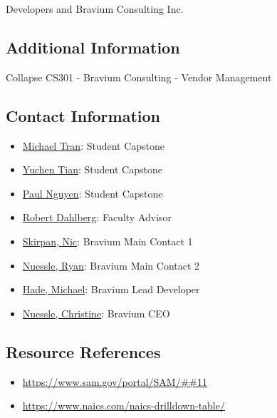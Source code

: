 \documentclass[10pt]{article}
\begin{document}
Developers and Bravium Consulting Inc.

\subsection{Additional Information}

Collapse CS301 - Bravium Consulting - Vendor Management

\subsection{Contact Information}

\begin{itemize}
	\item\href{tranml3@mymail.vcu.edu}{Michael Tran}: Student Capstone 
	\item\href{tiany4@mymail.vcu.edu}{Yuchen Tian}: Student Capstone 
	\item\href{nguyenp22@mymail.vcu.edu}{Paul Nguyen}: Student Capstone 
	\item\href{dahlbergra@mymail.vcu.edu}{Robert Dahlberg}: Faculty Advisor
	\item\href{nskirpan@braviumconsulting.com}{Skirpan, Nic}: Bravium Main Contact 1
	\item\href{rnuessle@braviumconsulting.com}{Nuessle, Ryan}: Bravium Main Contact 2
	\item\href{mhade@braviumconsulting.com}{Hade, Michael}: Bravium Lead Developer
	\item\href{cnuessle@braviumconsulting.com}{Nuessle, Christine}: Bravium CEO

\end{itemize}

\subsection{Resource References}

\begin{itemize}
	\item \url{https://www.sam.gov/portal/SAM/##11}
	\item \url{https://www.naics.com/naics-drilldown-table/}
\end{itemize}





\end{document}
